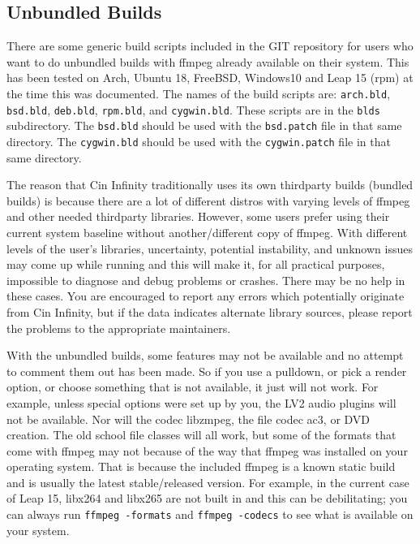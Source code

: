 \subsection{Unbundled Builds}%
\label{sub:unbundled_builds}

There are some generic build scripts included in the \CGG{} GIT
repository for users who want to do unbundled builds with ffmpeg
already available on their system.  This has been tested on Arch,
Ubuntu 18, FreeBSD, Windows10 and Leap 15 (rpm) at the time this
was documented.
%
The names of the build scripts are: \texttt{arch.bld},
\texttt{bsd.bld}, \texttt{deb.bld}, \texttt{rpm.bld}, and
\texttt{cygwin.bld}.  These scripts are in the \texttt{blds}
subdirectory.  The \texttt{bsd.bld} should be used with the
\texttt{bsd.patch} file in that same directory.  The
\texttt{cygwin.bld} should be used with the \texttt{cygwin.patch}
file in that same directory.

The reason that Cin Infinity traditionally uses its own thirdparty builds
(bundled builds) is because there are a lot of different distros
with varying levels of ffmpeg and other needed thirdparty
libraries.  However, some users prefer using their current system
baseline without another/different copy of ffmpeg.
%
With different levels of the user’s libraries, uncertainty,
potential instability, and unknown issues may come up while
running \CGG{} and this will make it, for all practical purposes,
impossible to diagnose and debug problems or crashes.
%
There may be no help in these cases.  You are encouraged to report
any errors which potentially originate from Cin Infinity, but if
the data indicates alternate library sources, please report the
problems to the appropriate maintainers.

With the unbundled builds, some features may not be available and
no attempt to comment them out has been made.  So if you use a
pulldown, or pick a render option, or choose something that is not
available, it just will not work.  For example, unless special
options were set up by you, the LV2 audio plugins will not be
available.  Nor will the codec libzmpeg, the file codec ac3, or
DVD creation.  The old school file classes will all work, but some
of the formats that come with ffmpeg may not because of the way
that ffmpeg was installed on your operating system.  That is
because the \CGG{} included ffmpeg is a known static build and is
usually the latest stable/released version.  For example, in the
current case of Leap 15, libx264 and libx265 are not built in and
this can be debilitating; you can always run \texttt{ffmpeg
  -formats} and \texttt{ffmpeg -codecs} to see what is available
on your system.

